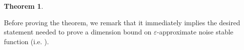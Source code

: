 \documentclass[11pt]{article}
\newcommand{\norm}[2]{\begin{Vmatrix} #2 \end{Vmatrix}_{#1}}
\newcommand{\eps}{\varepsilon}
\newcommand{\bbR}{{\mathbb R}}
\newcommand{\calR}{\mathcal{R}}
\newtheorem{theorem}{Theorem}[section]
\begin{document}
\begin{theorem}
\end{theorem}

\noindent Before proving the theorem, we remark that it immediately implies the desired statement needed to prove a dimension bound on $\eps$-approximate noise stable function (i.e. ).
\end{document}
